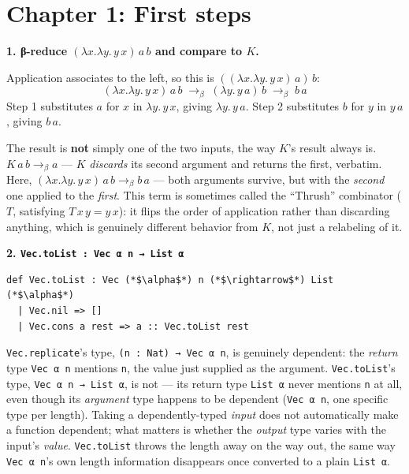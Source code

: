 \section{Chapter 1: First steps}\label{sec:14-appendix-solutions:01-chapter-1:1}

\textbf{1. β-reduce \((\lambda x.\lambda y.\, y\, x)\, a\, b\) and compare to \(K\).}

Application associates to the left, so this is \(((\lambda x.\lambda y.\, y\, x)\, a)\, b\): \[
(\lambda x.\lambda y.\, y\, x)\, a\, b
\;\longrightarrow_\beta\; (\lambda y.\, y\, a)\, b
\;\longrightarrow_\beta\; b\, a
\] Step 1 substitutes \(a\) for \(x\) in \(\lambda y.\, y\, x\), giving \(\lambda y.\, y\, a\). Step 2 substitutes \(b\) for \(y\) in \(y\, a\), giving \(b\, a\).

The result is \textbf{not} simply one of the two inputs, the way \(K\)'s result always is. \(K\,a\,b \to_\beta a\) --- \(K\) \emph{discards} its second argument and returns the first, verbatim. Here, \((\lambda x.\lambda y.\, y\, x)\, a\, b
\to_\beta b\, a\) --- both arguments survive, but with the \emph{second} one applied to the \emph{first}. This term is sometimes called the ``Thrush'' combinator (\(T\), satisfying \(T\, x\, y = y\, x\)): it flips the order of application rather than discarding anything, which is genuinely different behavior from \(K\), not just a relabeling of it.

\textbf{2. \texttt{Vec.toList : Vec α n → List α}}

\begin{lstlisting}
def Vec.toList : Vec (*$\alpha$*) n (*$\rightarrow$*) List (*$\alpha$*)
  | Vec.nil => []
  | Vec.cons a rest => a :: Vec.toList rest
\end{lstlisting}

\texttt{Vec.replicate}'s type, \texttt{(n : Nat) → Vec α n}, is genuinely dependent: the \emph{return} type \texttt{Vec α n} mentions \texttt{n}, the value just supplied as the argument. \texttt{Vec.toList}'s type, \texttt{Vec α n → List α}, is not --- its return type \texttt{List α} never mentions \texttt{n} at all, even though its \emph{argument} type happens to be dependent (\texttt{Vec α n}, one specific type per length). Taking a dependently-typed \emph{input} does not automatically make a function dependent; what matters is whether the \emph{output} type varies with the input's \emph{value}. \texttt{Vec.toList} throws the length away on the way out, the same way \texttt{Vec α n}'s own length information disappears once converted to a plain \texttt{List α}.

